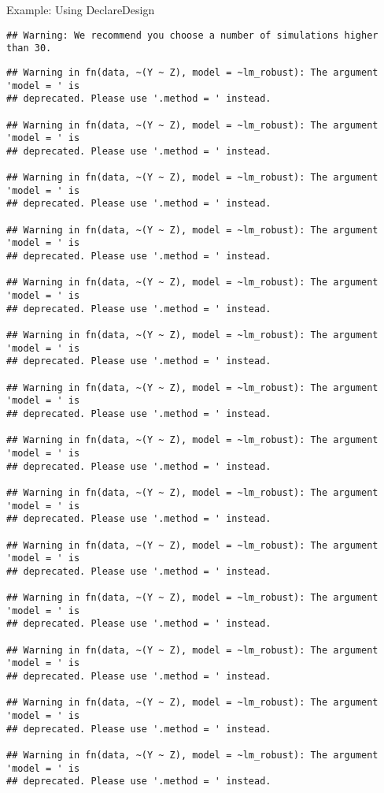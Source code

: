 \documentclass[
  ignorenonframetext,
]{beamer}
\begin{document}
\begin{frame}[fragile]{Example: Using DeclareDesign}
\begin{verbatim}
## Warning: We recommend you choose a number of simulations higher than 30.
\end{verbatim}

\begin{verbatim}
## Warning in fn(data, ~(Y ~ Z), model = ~lm_robust): The argument 'model = ' is
## deprecated. Please use '.method = ' instead.

## Warning in fn(data, ~(Y ~ Z), model = ~lm_robust): The argument 'model = ' is
## deprecated. Please use '.method = ' instead.

## Warning in fn(data, ~(Y ~ Z), model = ~lm_robust): The argument 'model = ' is
## deprecated. Please use '.method = ' instead.

## Warning in fn(data, ~(Y ~ Z), model = ~lm_robust): The argument 'model = ' is
## deprecated. Please use '.method = ' instead.

## Warning in fn(data, ~(Y ~ Z), model = ~lm_robust): The argument 'model = ' is
## deprecated. Please use '.method = ' instead.

## Warning in fn(data, ~(Y ~ Z), model = ~lm_robust): The argument 'model = ' is
## deprecated. Please use '.method = ' instead.

## Warning in fn(data, ~(Y ~ Z), model = ~lm_robust): The argument 'model = ' is
## deprecated. Please use '.method = ' instead.

## Warning in fn(data, ~(Y ~ Z), model = ~lm_robust): The argument 'model = ' is
## deprecated. Please use '.method = ' instead.

## Warning in fn(data, ~(Y ~ Z), model = ~lm_robust): The argument 'model = ' is
## deprecated. Please use '.method = ' instead.

## Warning in fn(data, ~(Y ~ Z), model = ~lm_robust): The argument 'model = ' is
## deprecated. Please use '.method = ' instead.

## Warning in fn(data, ~(Y ~ Z), model = ~lm_robust): The argument 'model = ' is
## deprecated. Please use '.method = ' instead.

## Warning in fn(data, ~(Y ~ Z), model = ~lm_robust): The argument 'model = ' is
## deprecated. Please use '.method = ' instead.

## Warning in fn(data, ~(Y ~ Z), model = ~lm_robust): The argument 'model = ' is
## deprecated. Please use '.method = ' instead.

## Warning in fn(data, ~(Y ~ Z), model = ~lm_robust): The argument 'model = ' is
## deprecated. Please use '.method = ' instead.


\end{verbatim}
\end{frame}
\end{document}
